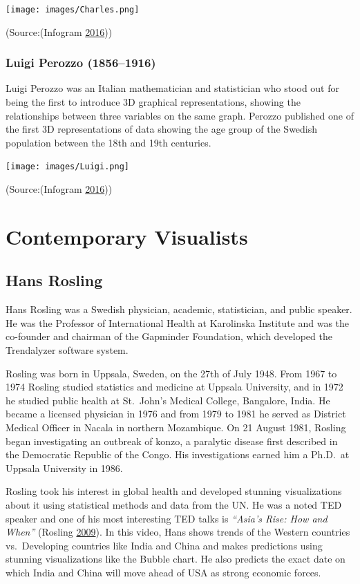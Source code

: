 \documentclass[]{book}
\begin{document}
\texttt{[image: images/Charles.png]}

(Source:(Infogram \protect\hyperlink{ref-history_viz}{2016}))

\hypertarget{luigi-perozzo-18561916}{%
\subsubsection{Luigi Perozzo (1856--1916)}\label{luigi-perozzo-18561916}}

Luigi Perozzo was an Italian mathematician and statistician who stood out for being the first to introduce 3D graphical representations, showing the relationships between three variables on the same graph. Perozzo published one of the first 3D representations of data showing the age group of the Swedish population between the 18th and 19th centuries.

\texttt{[image: images/Luigi.png]}

(Source:(Infogram \protect\hyperlink{ref-history_viz}{2016}))

\hypertarget{contemporary-visualists}{%
\section{Contemporary Visualists}\label{contemporary-visualists}}

\hypertarget{hans-rosling}{%
\subsection{Hans Rosling}\label{hans-rosling}}

Hans Rosling was a Swedish physician, academic, statistician, and public speaker. He was the Professor of International Health at Karolinska Institute and was the co-founder and chairman of the Gapminder Foundation, which developed the Trendalyzer software system.

Rosling was born in Uppsala, Sweden, on the 27th of July 1948. From 1967 to 1974 Rosling studied statistics and medicine at Uppsala University, and in 1972 he studied public health at St.~John's Medical College, Bangalore, India. He became a licensed physician in 1976 and from 1979 to 1981 he served as District Medical Officer in Nacala in northern Mozambique. On 21 August 1981, Rosling began investigating an outbreak of konzo, a paralytic disease first described in the Democratic Republic of the Congo. His investigations earned him a Ph.D.~at Uppsala University in 1986.

Rosling took his interest in global health and developed stunning visualizations about it using statistical methods and data from the UN. He was a noted TED speaker and one of his most interesting TED talks is \emph{``Asia's Rise: How and When''} (Rosling \protect\hyperlink{ref-hans}{2009}). In this video, Hans shows trends of the Western countries vs.~Developing countries like India and China and makes predictions using stunning visualizations like the Bubble chart. He also predicts the exact date on which India and China will move ahead of USA as strong economic forces.
\end{document}
